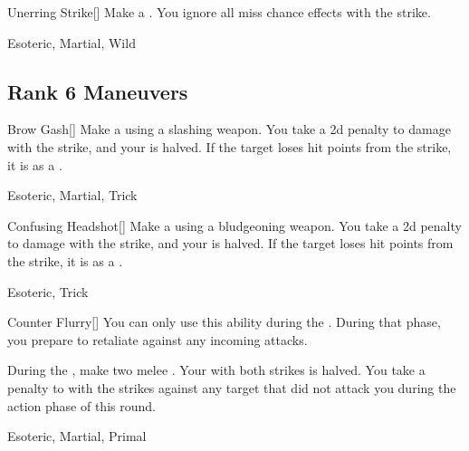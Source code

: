 \lowercase{\hypertarget{maneuver:Unerring Strike}{}}\label{maneuver:Unerring Strike}
\hypertarget{maneuver:Unerring Strike}{}
\begin{freeability}[Rank 5]{Unerring Strike}[]
Make a .
You ignore all miss chance effects with the strike.


 Esoteric, Martial, Wild
\end{freeability}
\vspace{0.25em}


\subsection{Rank 6 Maneuvers}

\lowercase{\hypertarget{maneuver:Brow Gash}{}}\label{maneuver:Brow Gash}
\hypertarget{maneuver:Brow Gash}{}
\begin{freeability}[Rank 6]{Brow Gash}[]
Make a  using a slashing weapon.
You take a \minus2d penalty to damage with the strike, and your  is halved.
If the target loses hit points from the strike, it is  as a .


 Esoteric, Martial, Trick
\end{freeability}
\vspace{0.25em}



\lowercase{\hypertarget{maneuver:Confusing Headshot}{}}\label{maneuver:Confusing Headshot}
\hypertarget{maneuver:Confusing Headshot}{}
\begin{freeability}[Rank 6]{Confusing Headshot}[]
Make a  using a bludgeoning weapon.
You take a \minus2d penalty to damage with the strike, and your  is halved.
If the target loses hit points from the strike, it is  as a .


 Esoteric, Trick
\end{freeability}
\vspace{0.25em}



\lowercase{\hypertarget{maneuver:Counter Flurry}{}}\label{maneuver:Counter Flurry}
\hypertarget{maneuver:Counter Flurry}{}
\begin{freeability}[Rank 6]{Counter Flurry}[]
You can only use this ability during the .
During that phase, you prepare to retaliate against any incoming attacks.

During the , make two melee .
Your  with both strikes is halved.
You take a  penalty to  with the strikes against any target that did not attack you during the action phase of this round.


 Esoteric, Martial, Primal
\end{freeability}
\vspace{0.25em}



